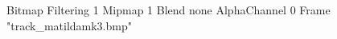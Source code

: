 {Bitmap
	{Filtering 1}
	{Mipmap 1}
	{Blend none}
	{AlphaChannel 0}
	{Frame "track_matildamk3.bmp"}
}
